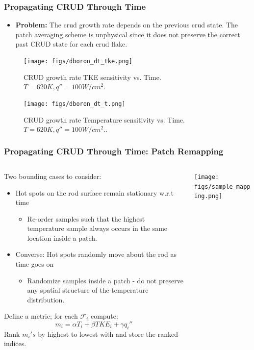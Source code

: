 \documentclass[t, pdftex]{beamer}
\begin{document}
\begin{frame}[shrink=10]
\frametitle{Propagating CRUD Through Time}
\begin{itemize}
\item  \textbf{Problem:}  The crud growth rate depends on the previous crud state.  The patch averaging scheme is unphysical since it does not preserve the correct past CRUD state for each crud flake. 
\end{itemize}
\begin{figure}[!htbp]
\centering
\begin{minipage}{.5\textwidth}
  \texttt{[image: figs/dboron\_dt\_tke.png]}
\caption{CRUD growth rate TKE sensitivity vs. Time. $T=620K, q''=100W/cm^2$.} 
\label{fig:crud_pre_map}
\end{minipage}%
\begin{minipage}{.5\textwidth}
  \texttt{[image: figs/dboron\_dt\_t.png]}
\caption{CRUD growth rate Temperature sensitivity vs. Time. $T=620K, q''=100W/cm^2$..}
\label{fig:crud_post_map}
\end{minipage}
\end{figure}
\end{frame}

\begin{frame}[shrink=20]
\frametitle{Propagating CRUD Through Time: Patch Remapping}
\begin{columns}
\begin{column}{0.5\textwidth}
   Two bounding cases to consider:
\begin{itemize}
\item Hot spots on the rod surface remain stationary w.r.t time
	\begin{itemize}
	\item Re-order samples such that the highest temperature sample always occurs in the same location inside a patch.
	\end{itemize}
\item Converse: Hot spots randomly move about the rod as time goes on
	\begin{itemize}
	\item Randomize samples inside a patch - do not preserve any spatial structure of the temperature distribution.
	\end{itemize}
\end{itemize}
Define a metric; for each $\mathcal F_i$ compute:
\[
m_i = \alpha T_i + \beta TKE_i + \gamma q_i''
\]
Rank $m_i's$ by highest to lowest with and store the ranked indices.
\end{column}
\begin{column}{0.5\textwidth}  %
    \begin{center}
     \texttt{[image: figs/sample\_mapping.png]}
     \end{center}
\end{column}
\end{columns}
\end{frame}
\end{document}
